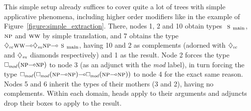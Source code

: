 This simple setup already suffices to cover quite a lot of trees with simple applicative phenomena, including higher order modifiers like in the example of Figure~\ref{figure:simple_extraction}.
There, nodes 1, 2 and 10 obtain types $\smain[s]$, $\np[s]$ and $\ww[s]$ by simple translation, and 7 obtains the type $\ddia{vc}\ww[s]\li\ddia{su}\np[s]\li\smain[s]$, having 10 and 2 as complements (adorned with $\ddia{vc}$ and $\ddia{su}$ diamonds respectively) and 1 as the result.
Node 2 forces the type $\dbox{mod}(\np[s]\li\np[s])$ to node 3 (as an adjunct with the \textit{mod} label), in turn forcing the type $\dbox{mod}(\dbox{mod}(\np[s]\li\np[s])\li\dbox{mod}(\np[s]\li\np[s]))$ to node 4 for the exact same reason. 
Nodes 5 and 6 inherit the types of their mothers (3 and 2), having no complements.
Within each domain, heads apply to their arguments and adjuncts drop their boxes to apply to the result.

